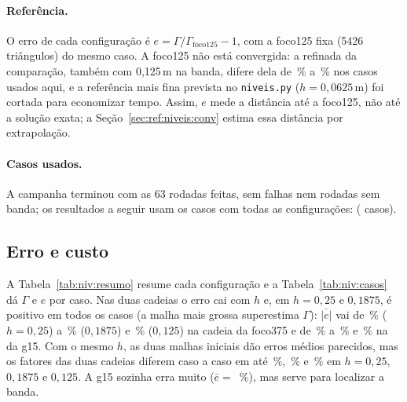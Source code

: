 \begin{table}[H]
  \centering\small
  \caption{Tempo de CPU (s) da rodada foco375 da etapa~1 nas duas campanhas (mesma malha e mesmo modelo).}
  \label{tab:niv:etapa1}
  
\end{table}

\paragraph{Referência.} O erro de cada configuração é $e = \Gamma/\Gamma_\text{foco125} - 1$, com a foco125 fixa
(5426 triângulos) do mesmo caso. A foco125 não está convergida: a refinada da comparação, também com 0,125\,m na
banda, difere dela de \nivFCEminS\,\% a \nivFCEmaxS\,\% nos casos usados aqui, e a referência mais fina prevista no \texttt{niveis.py}
($h = 0{,}0625$\,m) foi cortada para economizar tempo. Assim, $e$ mede a distância até a foco125, não até a solução
exata; a Seção~\ref{sec:ref:niveis:conv} estima essa distância por extrapolação.

\paragraph{Casos usados.} A campanha terminou com as 63 rodadas feitas, sem falhas nem rodadas sem banda; os
resultados a seguir usam os casos com todas as configurações: \nivCasos{} (\nivNcasos{} casos).

\subsection{Erro e custo}\label{sec:ref:niveis:resultados}

A Tabela~\ref{tab:niv:resumo} resume cada configuração e a Tabela~\ref{tab:niv:casos} dá $\Gamma$ e $e$ por caso. Nas
duas cadeias o erro cai com $h$ e, em $h = 0{,}25$ e $0{,}1875$, é positivo em todos os casos (a malha mais grossa
superestima $\Gamma$): $\overline{|e|}$ vai de
\nivFAEabs\,\% ($h = 0{,}25$) a \nivFBEabs\,\% ($0{,}1875$) e \nivFCEabs\,\% ($0{,}125$) na cadeia da foco375 e de
\nivGAEabs\,\% a \nivGBEabs\,\% e \nivGCEabs\,\% na da g15. Com o mesmo $h$, as duas malhas iniciais dão erros médios
parecidos, mas os fatores das duas cadeias diferem caso a caso em até \nivDgaMax\,\%, \nivDgbMax\,\% e
\nivDgcMax\,\% em $h = 0{,}25$, $0{,}1875$ e $0{,}125$. A g15 sozinha erra muito ($\bar e = $ \nivGIEmed\,\%), mas serve para localizar a banda.

\begin{table}[H]
  \centering\footnotesize
  \setlength{\tabcolsep}{4pt}
  \caption{Resumo por configuração: triângulos (média), erro em relação à foco125 ($\overline{|e|}$, $\max|e|$ e
  $\bar e$, com sinal), tempos médios da cadeia por caso (CPU e parede, sem normalizar), custo relativo à foco125
  ($R/R_{125}$, CPU normalizado pela foco375 de cada campanha) e contenção da banda (a maior distância $d_{\max}$ dos
  pontos da banda da rodada refinada aos pontos da banda que fizeram a malha dela, e a fração média dos pontos a mais
  de 0,375\,m). $^{*}$: a refinada da comparação (\texttt{PARALELO=2}).}
  \label{tab:niv:resumo}
  
\end{table}

